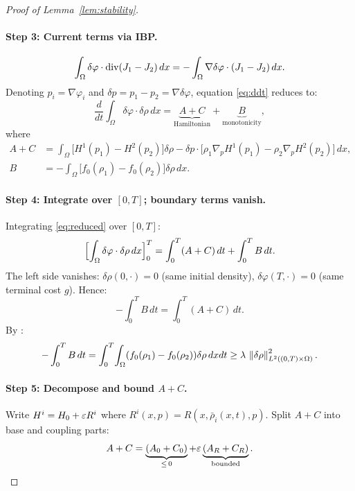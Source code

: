 \begin{proof}[Proof of Lemma~\ref{lem:stability}]
\paragraph{Step 3: Current terms via IBP.}
\[
  \int_\Omega \delta\varphi\cdot\operatorname{div}(J_1 - J_2)\, dx
  = -\int_\Omega \nabla\delta\varphi\cdot(J_1 - J_2)\, dx.
\]
Denoting $p_i = \nabla\varphi_i$ and $\delta p = p_1 - p_2 = \nabla\delta\varphi$,
equation \eqref{eq:ddt} reduces to:
\begin{equation}\label{eq:reduced}
  \frac{d}{dt}\int_\Omega\delta\varphi\cdot\delta\rho\, dx
  = \underbrace{A + C}_{\text{Hamiltonian}} + \underbrace{B}_{\text{monotonicity}},
\end{equation}
where
\begin{align*}
  A + C &= \int_\Omega \bigl[H^1(p_1) - H^2(p_2)\bigr]\delta\rho
           - \delta p \cdot\bigl[\rho_1\nabla_p H^1(p_1) - \rho_2\nabla_p H^2(p_2)\bigr]\, dx,\\
  B     &= -\int_\Omega \bigl[f_0(\rho_1) - f_0(\rho_2)\bigr]\delta\rho\, dx.
\end{align*}

\paragraph{Step 4: Integrate over $[0,T]$; boundary terms vanish.}
Integrating \eqref{eq:reduced} over $[0,T]$:
\[
  \Bigl[\int_\Omega \delta\varphi\cdot\delta\rho\, dx\Bigr]_0^T
  = \int_0^T (A+C)\, dt + \int_0^T B\, dt.
\]
The left side vanishes:
$\delta\rho(0,\cdot) = 0$ (same initial density),
$\delta\varphi(T,\cdot) = 0$ (same terminal cost $g$).
Hence:
\begin{equation}\label{eq:balance}
  -\int_0^T B\, dt = \int_0^T (A+C)\, dt.
\end{equation}
By :
\begin{equation}\label{eq:mono_bound}
  -\int_0^T B\, dt
  = \int_0^T\!\int_\Omega (f_0(\rho_1)-f_0(\rho_2))\delta\rho\, dxdt
  \geq \lambda\,\left\lVert \delta\rho \right\rVert^2_{L^2((0,T)\times\Omega)}.
\end{equation}

\paragraph{Step 5: Decompose and bound $A + C$.}
Write $H^i = H_0 + \varepsilon R^i$ where $R^i(x,p) = R(x,\bar\rho_i(x,t),p)$.
Split $A+C$ into base and coupling parts:
\begin{equation}\label{eq:split}
  A+C = \underbrace{(A_0 + C_0)}_{\leq\, 0} + \varepsilon\underbrace{(A_R + C_R)}_{\text{bounded}}.
\end{equation}


\end{proof}
